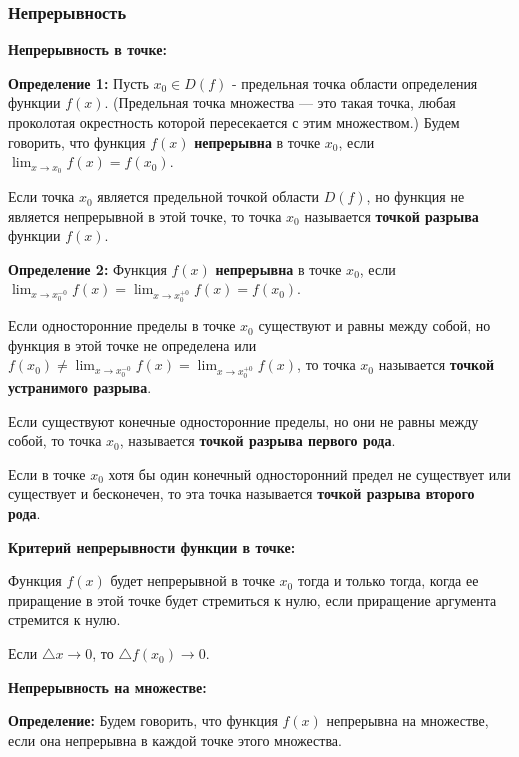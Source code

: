 \documentclass[12pt]{matmex-diploma}
\begin{document}
        \subsubsection*{Непрерывность}
        
            \textbf{Непрерывность в точке:}
            
            \textbf{Определение 1:}
            Пусть $x_0 \in D(f)$ - предельная точка области определения функции $f(x)$. (Предельная точка множества — это такая точка, любая проколотая окрестность которой пересекается с этим множеством.)  Будем говорить, что функция $f(x)$ \textbf{непрерывна} в точке $x_0$, если $\lim_{x \to x_0}f(x) = f(x_0)$.
            
            Если точка $x_0$ является предельной точкой области $D(f)$, но функция не является непрерывной в этой точке, то точка $x_0$ называется \textbf{точкой разрыва} функции $f(x)$.
            
            \textbf{Определение 2:}
            Функция $f(x)$ \textbf{непрерывна} в точке $x_0$, если $\lim_{x \to x_0^{-0}}f(x) = \lim_{x \to x_0^{+0}}f(x)  = f(x_0)$.
            
            Если односторонние пределы в точке $x_0$ существуют и равны между собой, но функция в этой точке не определена или $f(x_0) \neq  \lim_{x \to x_0^{-0}}f(x) = \lim_{x \to x_0^{+0}}f(x)$, то точка $x_0$ называется \textbf{точкой устранимого разрыва}.
            
            Если существуют конечные односторонние пределы, но они не равны между собой, то точка $x_0$, называется \textbf{точкой разрыва первого рода}.
            
            Если в точке $x_0$ хотя бы один конечный односторонний предел не существует или существует и бесконечен, то эта точка называется \textbf{точкой разрыва второго рода}.
            
            \textbf{Критерий непрерывности функции в точке:}
            
            Функция $f(x)$ будет непрерывной в точке $x_0$ тогда и только тогда, когда ее приращение в этой точке будет стремиться к нулю, если приращение аргумента стремится к нулю.
            
            Если $\bigtriangleup x \to 0$, то $\bigtriangleup f(x_0) \to 0$.
            
            \textbf{Непрерывность на множестве:}
            
            \textbf{Определение:}
            Будем говорить, что функция $f(x)$ непрерывна на множестве, если она непрерывна в каждой точке этого множества.
            
\end{document}
